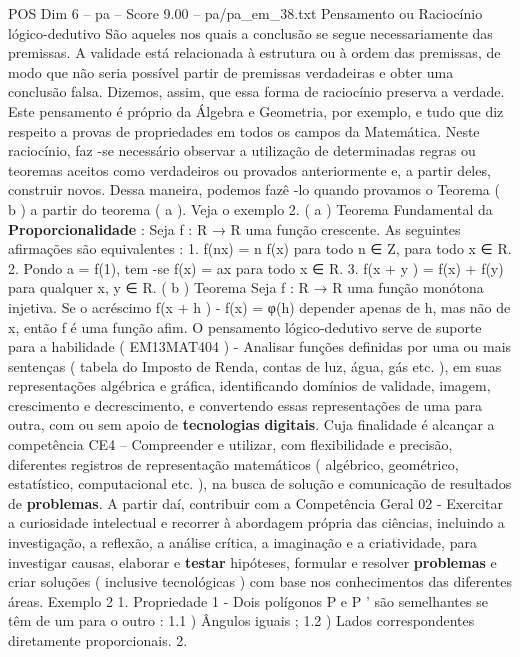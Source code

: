 \begin{textsample}{POS Dim 6 – pa – Score 9.00 – pa/pa\_em\_38.txt}  \label{ex:f6_pos_066}
Pensamento ou Raciocínio lógico-dedutivo São aqueles nos quais a conclusão se segue necessariamente das premissas.
A validade está relacionada à estrutura ou à ordem das premissas, de modo que não seria possível partir de premissas verdadeiras e obter uma conclusão falsa.
Dizemos, assim, que essa forma de raciocínio preserva a verdade.
Este pensamento é próprio da Álgebra e Geometria, por exemplo, e tudo que diz respeito a provas de propriedades em todos os campos da Matemática.
Neste raciocínio, faz -se necessário observar a utilização de determinadas regras ou teoremas aceitos como verdadeiros ou provados anteriormente e, a partir deles, construir novos.
Dessa maneira, podemos fazê -lo quando provamos o Teorema ( b ) a partir do teorema ( a ).
Veja o exemplo 2. ( a ) Teorema Fundamental da \textbf{Proporcionalidade} : Seja f : R → R uma função crescente.
As seguintes afirmações são equivalentes : 1. f(nx) = n f(x) para todo n ∈ Z, para todo x ∈ R. 2.
Pondo a = f(1), tem -se f(x) = ax para todo x ∈ R. 3. f(x + y ) = f(x) + f(y) para qualquer x, y ∈ R. ( b ) Teorema Seja f : R → R uma função monótona injetiva.
Se o acréscimo f(x + h ) - f(x) = φ(h) depender apenas de h, mas não de x, então f é uma função afim.
O pensamento lógico-dedutivo serve de suporte para a habilidade ( EM13MAT404 ) - Analisar funções definidas por uma ou mais sentenças ( tabela do Imposto de Renda, contas de luz, água, gás etc. ), em suas representações algébrica e gráfica, identificando domínios de validade, imagem, crescimento e decrescimento, e convertendo essas representações de uma para outra, com ou sem apoio de \textbf{tecnologias} \textbf{digitais}.
Cuja finalidade é alcançar a competência CE4 – Compreender e utilizar, com flexibilidade e precisão, diferentes registros de representação matemáticos ( algébrico, geométrico, estatístico, computacional etc. ), na busca de solução e comunicação de resultados de \textbf{problemas}.
A partir daí, contribuir com a Competência Geral 02 - Exercitar a curiosidade intelectual e recorrer à abordagem própria das ciências, incluindo a investigação, a reflexão, a análise crítica, a imaginação e a criatividade, para investigar causas, elaborar e \textbf{testar} hipóteses, formular e resolver \textbf{problemas} e criar soluções ( inclusive tecnológicas ) com base nos conhecimentos das diferentes áreas.
Exemplo 2 1.
Propriedade 1 - Dois polígonos P e P ’ são semelhantes se têm de um para o outro : 1.1 ) Ângulos iguais ; 1.2 ) Lados correspondentes diretamente proporcionais. 2.

\end{textsample}

